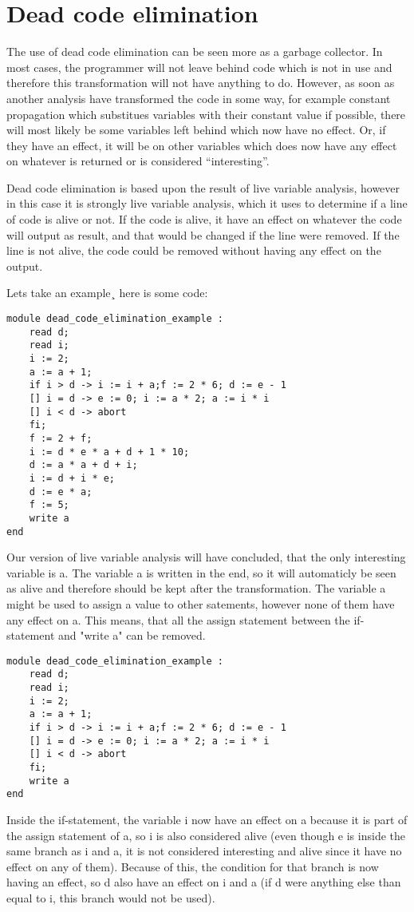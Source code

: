 \section{Dead code elimination}

The use of dead code elimination can be seen more as a garbage collector. In most cases, the programmer will not leave behind code which is not in use and therefore this transformation will not have anything to do. However, as soon as another analysis have transformed the code in some way, for example constant propagation which substitues variables with their constant value if possible, there will most likely be some variables left behind which now have no effect. Or, if they have an effect, it will be on other variables which does now have any effect on whatever is returned or is considered ``interesting''.

Dead code elimination is based upon the result of live variable analysis, however in this case it is strongly live variable analysis, which it uses to determine if a line of code is alive or not. If the code is alive, it have an effect on whatever the code will output as result, and that would be changed if the line were removed. If the line is not alive, the code could be removed without having any effect on the output.

Lets take an example¸ here is some code:
\begin{lstlisting}
module dead_code_elimination_example :
	read d;
	read i;
	i := 2;
	a := a + 1;
	if i > d -> i := i + a;f := 2 * 6; d := e - 1
	[] i = d -> e := 0; i := a * 2; a := i * i
	[] i < d -> abort
	fi;
	f := 2 + f;
	i := d * e * a + d + 1 * 10;
	d := a * a + d + i;
	i := d + i * e;
	d := e * a;
	f := 5;
	write a
end
\end{lstlisting}
Our version of live variable analysis will have concluded, that the only interesting variable is a. The variable a is written in the end, so it will automaticly be seen as alive and therefore should be kept after the transformation. The variable a might be used to assign a value to other satements, however none of them have any effect on a. This means, that all the assign statement between the if-statement and "write a" can be removed.
\begin{lstlisting}
module dead_code_elimination_example :
	read d;
	read i;
	i := 2;
	a := a + 1;
	if i > d -> i := i + a;f := 2 * 6; d := e - 1
	[] i = d -> e := 0; i := a * 2; a := i * i
	[] i < d -> abort
	fi;
	write a
end
\end{lstlisting}
Inside the if-statement, the variable i now have an effect on a because it is part of the assign statement of a, so i is also considered alive (even though e is inside the same branch as i and a, it is not considered interesting and alive since it have no effect on any of them). Because of this, the condition for that branch is now having an effect, so d also have an effect on i and a (if d were anything else than equal to i, this branch would not be used).

